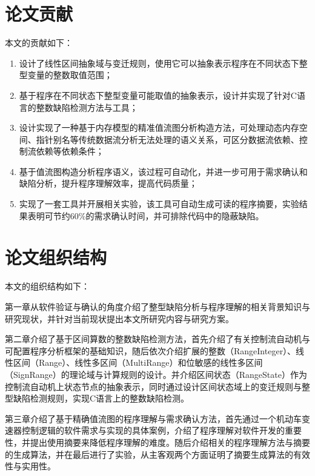  \section{论文贡献}
 
 本文的贡献如下：
 \begin{enumerate}
 	\item 设计了线性区间抽象域与变迁规则，使用它可以抽象表示程序在不同状态下整型变量的整数取值范围；
 	
 	\item 基于程序在不同状态下整型变量可能取值的抽象表示，设计并实现了针对C语言的整数缺陷检测方法与工具；
 	
	\item 设计实现了一种基于内存模型的精准值流图分析构造方法，可处理动态内存空间、指针别名等传统数据流分析无法处理的语义关系，可区分数据流依赖、控制流依赖等依赖条件；
	
	\item 基于值流图构造分析程序语义，该过程可自动化，并进一步可用于需求确认和缺陷分析，提升程序理解效率，提高代码质量；
	
	\item 实现了一套工具并开展相关实验，该工具可自动生成可读的程序摘要，实验结果表明可节约60\%的需求确认时间，并可排除代码中的隐蔽缺陷。
 \end{enumerate}
 
 \section{论文组织结构}
 
 本文的组织结构如下：
 
 第一章从软件验证与确认的角度介绍了整型缺陷分析与程序理解的相关背景知识与研究现状，并针对当前现状提出本文所研究内容与研究方案。
 
 第二章介绍了基于区间算数的整数缺陷检测方法，首先介绍了有关控制流自动机与可配置程序分析框架的基础知识，随后依次介绍扩展的整数（RangeInteger）、线性区间（Range）、线性多区间（MultiRange）和位敏感的线性多区间（SignRange）的理论域与计算规则的设计。并介绍区间状态（RangeState）作为控制流自动机上状态节点的抽象表示，同时通过设计区间状态域上的变迁规则与整型缺陷检测规则，实现C语言上的整数缺陷检测。
 
 第三章介绍了基于精确值流图的程序理解与需求确认方法，首先通过一个机动车变速器控制逻辑的软件需求与实现的具体案例，介绍了程序理解对软件开发的重要性，并提出使用摘要来降低程序理解的难度。随后介绍相关的程序理解方法与摘要的生成算法，并在最后进行了实验，从主客观两个方面证明了摘要生成算法的有效性与实用性。
 
 
 
 
 
 
 
 
 
 
 
 
 
 
 
 
 
 
 
 
 
 
 
 
 
 
 
 
 
 
 
 
 